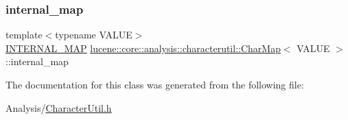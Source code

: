 \mbox{\label{classlucene_1_1core_1_1analysis_1_1characterutil_1_1CharMap_aa86d94ea61970d00283d8eb72d12e1cf}} 
\subsubsection{\texorpdfstring{internal\+\_\+map}{internal\_map}}
{\footnotesize\ttfamily template$<$typename V\+A\+L\+UE$>$ \\
\mbox{\hyperlink{classlucene_1_1core_1_1analysis_1_1characterutil_1_1CharMap_a0fe744ab48aa6f998a3d7e159a351d69}{I\+N\+T\+E\+R\+N\+A\+L\+\_\+\+M\+AP}} \mbox{\hyperlink{classlucene_1_1core_1_1analysis_1_1characterutil_1_1CharMap}{lucene\+::core\+::analysis\+::characterutil\+::\+Char\+Map}}$<$ V\+A\+L\+UE $>$\+::internal\+\_\+map\hspace{0.3cm}{\ttfamily [private]}}



The documentation for this class was generated from the following file\+:\begin{DoxyCompactItemize}
\item 
Analysis/\mbox{\hyperlink{CharacterUtil_8h}{Character\+Util.\+h}}\end{DoxyCompactItemize}
